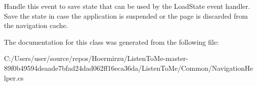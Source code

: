 Handle this event to save state that can be used by the Load\+State event handler. Save the state in case the application is suspended or the page is discarded from the navigation cache. 



The documentation for this class was generated from the following file\+:\begin{DoxyCompactItemize}
\item 
C\+:/\+Users/user/source/repos/\+Hoermirzu/\+Listen\+To\+Me-\/master-\/89f0b49594deaade7bfad24dad062ff16eca36da/\+Listen\+To\+Me/\+Common/Navigation\+Helper.\+cs\end{DoxyCompactItemize}
